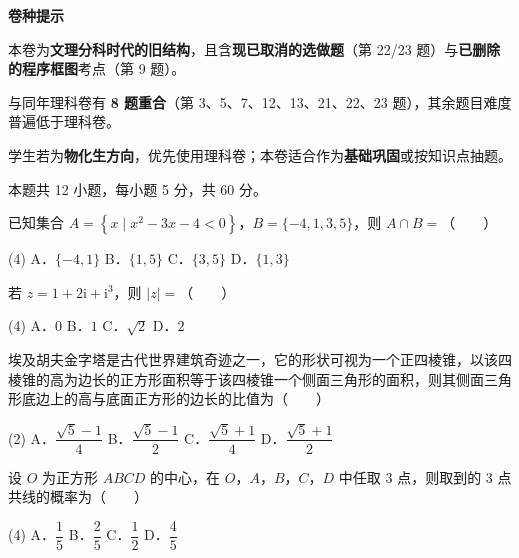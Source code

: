 

\begin{gknotice}
\textbf{ 卷种提示}

本卷为\textbf{文理分科时代的旧结构}，且含\textbf{现已取消的选做题}（第 22/23 题）与\textbf{已删除的程序框图}考点（第 9 题）。

与同年理科卷有 \textbf{8 题重合}（第 3、5、7、12、13、21、22、23 题），其余题目难度普遍低于理科卷。

学生若为\textbf{物化生方向}，优先使用理科卷；本卷适合作为\textbf{基础巩固}或按知识点抽题。
\end{gknotice}

\par\medskip


\begin{gktip}
本题共 12 小题，每小题 5 分，共 60 分。
\end{gktip}

已知集合 $A=\left\{x\mid x^{2}-3x-4<0\right\}$，$B=\{-4,1,3,5\}$，则 $A\cap B=$（　　）

\begin{gkopts}(4)
\task A．$\{-4,1\}$
\task B．$\{1,5\}$
\task C．$\{3,5\}$
\task D．$\{1,3\}$
\end{gkopts}

若 $z=1+2\mathrm i+\mathrm i^{3}$，则 $|z|=$（　　）

\begin{gkopts}(4)
\task A．$0$
\task B．$1$
\task C．$\sqrt2$
\task D．$2$
\end{gkopts}

埃及胡夫金字塔是古代世界建筑奇迹之一，它的形状可视为一个正四棱锥，以该四棱锥的高为边长的正方形面积等于该四棱锥一个侧面三角形的面积，则其侧面三角形底边上的高与底面正方形的边长的比值为（　　）

\begin{gkopts}(2)
\task A．$\dfrac{\sqrt5-1}4$
\task B．$\dfrac{\sqrt5-1}2$
\task C．$\dfrac{\sqrt5+1}4$
\task D．$\dfrac{\sqrt5+1}2$
\end{gkopts}

设 $O$ 为正方形 $ABCD$ 的中心，在 $O$，$A$，$B$，$C$，$D$ 中任取 $3$ 点，则取到的 $3$ 点共线的概率为（　　）

\begin{gkopts}(4)
\task A．$\dfrac15$
\task B．$\dfrac25$
\task C．$\dfrac12$
\task D．$\dfrac45$
\end{gkopts}

